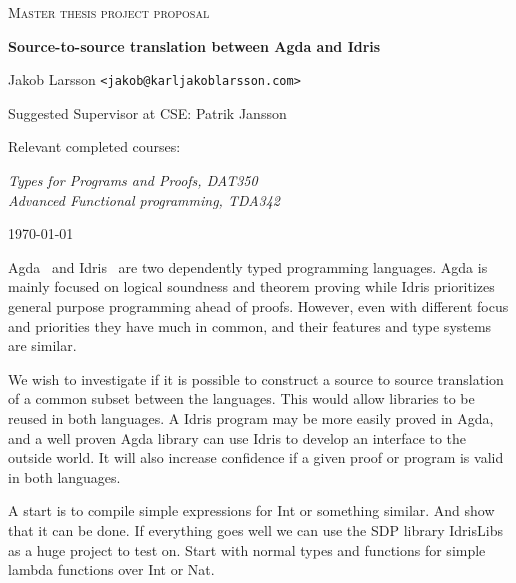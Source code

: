 \documentclass{scrartcl}
\begin{document}
\begin{titlepage}

\centering
{\scshape\LARGE Master thesis project proposal}

\vspace{0.5cm}
{\huge\bfseries Source-to-source translation between Agda and Idris
  }

\vspace{2cm}
{\Large Jakob Larsson \texttt{<jakob@karljakoblarsson.com>}}

\vspace{1.0cm}
{\large Suggested Supervisor at CSE: Patrik Jansson }

\vspace{1.5cm}
{\large Relevant completed courses:}

{\itshape
Types for Programs and Proofs, DAT350 \\
Advanced Functional programming, TDA342 \\
}

\vfill
{\large \today}

\end{titlepage}


Agda~\cite{agda} and Idris~\cite{idris} are two dependently typed programming
languages.  Agda is mainly focused on logical soundness and theorem proving
while Idris prioritizes general purpose programming ahead of proofs. However,
even with different focus and priorities they have much in common, and their
features and type systems are similar.

We wish to investigate if it is possible to construct a source to source
translation of a common subset between the languages. This would allow
libraries to be reused in both languages. A Idris program may be more easily
proved in Agda, and a well proven Agda library can use Idris to develop an
interface to the outside world.  It will also increase confidence if a given
proof or program is valid in both languages.


A start is to compile simple expressions for Int or something similar. And
show that it can be done. If everything goes well we can use the SDP library
IdrisLibs as a huge project to test on.
Start with normal types and functions for simple lambda functions over Int or
Nat.
\end{document}
